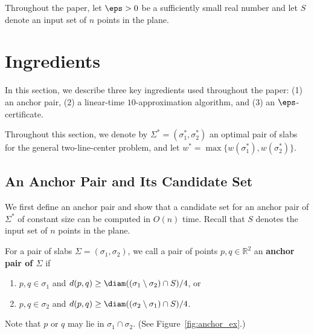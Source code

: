 Throughout the paper, let $\eps > 0$ be a sufficiently small real number and let $S$ denote an input set of $n$ points in the plane.


\section{Ingredients}
\label{sec:polyeps}

In this section, we describe three key ingredients used throughout the paper: (1) an anchor pair, (2) a linear-time $10$-approximation algorithm, and (3) an $\eps$-certificate.




Throughout this section, we denote by $\Sigma^* = (\sigma_1^*, \sigma_2^*)$ an optimal pair of slabs for the general two-line-center problem, and let $w^* = \max \{w(\sigma_1^*), w(\sigma_2^*) \}$.

\subsection{An Anchor Pair and Its Candidate Set}
\label{sec:anchor_pair}
We first define an anchor pair and show that a candidate set for an anchor pair of $\Sigma^*$ of constant size can be computed in $O(n)$ time.
Recall that $S$ denotes the input set of $n$ points in the plane.

\begin{definition}
    For a pair of slabs $\Sigma = (\sigma_1, \sigma_2)$,
    we call a pair of points $p, q \in \mathbb R^2$ an \textbf{anchor pair of $\Sigma$} if 
    \begin{enumerate}[(1)]
        \item $p, q\in \sigma_1$ and $d(p, q) \ge \diam((\sigma_1 \setminus \sigma_2) \cap S)/4$, or 
        \item $p, q\in \sigma_2$ and $d(p, q) \ge \diam((\sigma_2 \setminus \sigma_1) \cap S)/4$.
    \end{enumerate}
     Note that $p$ or $q$ may lie in $\sigma_1\cap \sigma_2$. (See Figure~\ref{fig:anchor_ex}.)
\end{definition} 



